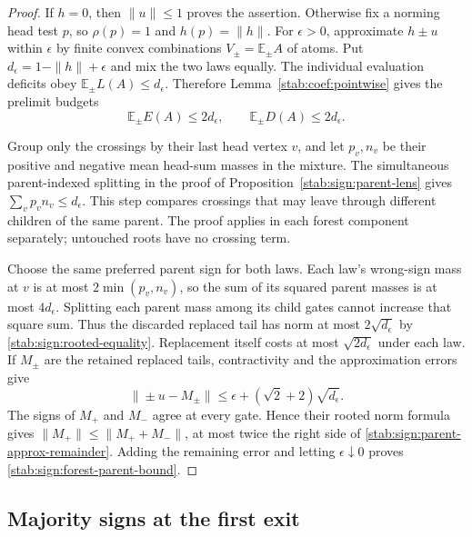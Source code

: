 \begin{proof}
If $h=0$, then $\|u\|\le1$ proves the assertion.  Otherwise fix
a norming head test $p$, so $\rho(p)=1$ and $h(p)=\|h\|$.
For $\epsilon>0$, approximate $h\pm u$ within $\epsilon$ by
finite convex combinations $V_\pm=\mathbb E_\pm A$ of atoms.
Put $d_\epsilon=1-\|h\|+\epsilon$ and mix the two laws equally.
The individual evaluation deficits obey
$\mathbb E_\pm L(A)\le d_\epsilon$.  Therefore
Lemma~\ref{stab:coef:pointwise} gives the prelimit budgets
\begin{equation}\label{stab:sign:parent-approx-budget}
 \mathbb E_\pm E(A)\le2d_\epsilon,\qquad
 \mathbb E_\pm D(A)\le2d_\epsilon.
\end{equation}

Group only the crossings by their last head vertex $v$, and let
$p_v,n_v$ be their positive and negative mean head-sum masses in
the mixture.  The simultaneous parent-indexed splitting in the
proof of Proposition~\ref{stab:sign:parent-lens} gives
$\sum_vp_vn_v\le d_\epsilon$.  This step compares crossings
that may leave through different children of the same parent.
The proof applies in each forest component separately; untouched
roots have no crossing term.

Choose the same preferred parent sign for both laws.  Each law's
wrong-sign mass at $v$ is at most $2\min(p_v,n_v)$, so the sum of
its squared parent masses is at most $4d_\epsilon$.  Splitting each
parent mass among its child gates cannot increase that square sum.
Thus the discarded replaced tail has norm at most $2\sqrt{d_\epsilon}$
by \eqref{stab:sign:rooted-equality}.  Replacement itself costs at
most $\sqrt{2d_\epsilon}$ under each law.  If $M_\pm$ are the
retained replaced tails, contractivity and the approximation errors
give
\begin{equation}\label{stab:sign:parent-approx-remainder}
 \|\pm u-M_\pm\|
 \le\epsilon+(\sqrt2+2)\sqrt{d_\epsilon}.
\end{equation}
The signs of $M_+$ and $M_-$ agree at every gate.  Hence their
rooted norm formula gives
$\|M_+\|\le\|M_++M_-\|$, at most twice the right side of
\eqref{stab:sign:parent-approx-remainder}.  Adding the remaining
error and letting $\epsilon\downarrow0$ proves
\eqref{stab:sign:forest-parent-bound}.
\end{proof}

\subsection{Majority signs at the first exit}

